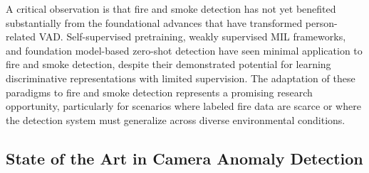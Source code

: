 \documentclass[10pt,a4paper]{article}
\renewcommand{\arraystretch}{1.12}
\begin{document}
\begin{table}[!t]
\centering
\caption{Representative fire/smoke detection and segmentation studies. Metrics are shown within task type only; mAP thresholds and test splits depend on the original study protocols.}
\label{tab:sota_fire_detection}
\renewcommand{\arraystretch}{1.2}
\end{table}

A critical observation is that fire and smoke detection has not yet benefited substantially from the foundational advances that have transformed person-related VAD. Self-supervised pretraining, weakly supervised MIL frameworks, and foundation model-based zero-shot detection have seen minimal application to fire and smoke detection, despite their demonstrated potential for learning discriminative representations with limited supervision. The adaptation of these paradigms to fire and smoke detection represents a promising research opportunity, particularly for scenarios where labeled fire data are scarce or where the detection system must generalize across diverse environmental conditions.


\subsection{State of the Art in Camera Anomaly Detection}
\label{subsec:sota_camera}
\end{document}
